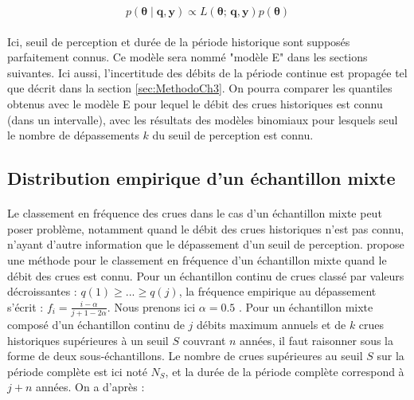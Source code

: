 		\begin{equation}
			p(\boldsymbol{\theta} \mid \boldsymbol{q},\boldsymbol{y}) \propto L(\boldsymbol{\theta};\,\boldsymbol{q},\boldsymbol{y})p(\boldsymbol{\theta})
		\label{eq:Bayes_Censure}
		\end{equation}

	\paragraph{} Ici, seuil de perception et durée de la période historique sont supposés parfaitement connus. Ce modèle sera nommé "modèle E" dans les sections suivantes. Ici aussi, l'incertitude des débits de la période continue est propagée tel que décrit dans la section \ref{sec:MethodoCh3}. On pourra comparer les quantiles obtenus avec le modèle E pour lequel le débit des crues historiques est connu (dans un intervalle), avec les résultats des modèles binomiaux pour lesquels seul le nombre de dépassements $k$ du seuil de perception est connu.
	

	\subsection{Distribution empirique d'un échantillon mixte}
	\label{subsec:DistEmpirique}
	
		\paragraph{} Le classement en fréquence des crues dans le cas d'un échantillon mixte peut poser problème, notamment quand le débit des crues historiques n'est pas connu, n'ayant d'autre information que le dépassement d'un seuil de perception. \citet{hirsch_probability_1987} propose une méthode pour le classement en fréquence d'un échantillon mixte quand le débit des crues est connu. Pour un échantillon continu de crues classé par valeurs décroissantes : $q(1) \geq ... \geq q(j)$, la fréquence empirique au dépassement s'écrit : $f_i = \frac{i-\alpha}{j+1-2\alpha}$. Nous prenons ici $\alpha = 0.5$ \citep{hazen_storage_1914}. Pour un échantillon mixte composé d'un échantillon continu de $j$ débits maximum annuels et de $k$ crues historiques supérieures à un seuil $S$ couvrant $n$ années, il faut raisonner sous la forme de deux sous-échantillons. Le nombre de crues supérieures au seuil $S$ sur la période complète est ici noté $N_S$, et la durée de la période complète correspond à $j + n$ années. On a d'après \citet{hirsch_probability_1987} :
		
